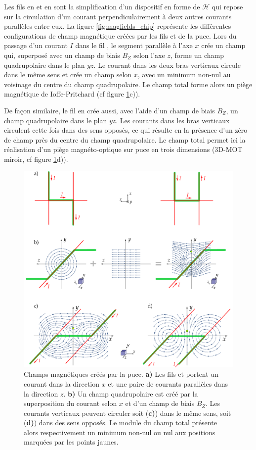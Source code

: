 Les fils en  et en  sont la simplification d'un dispositif en forme de $\mathcal{H}$ qui repose sur la circulation d'un courant perpendiculairement à deux autres courants parallèles entre eux.
La figure \eqref{fig:magfields_chip} représente les différentes configurations de champ magnétique créées par les fils  et  de la puce.
Lors du passage d'un courant $I$ dans le fil , le segment parallèle à l'axe $x$ crée un champ qui, superposé avec un champ de biais $B_Z$ selon l'axe $z$, forme un champ quadrupolaire dans le plan $yz$.
Le courant dans les deux bras verticaux circule dans le même sens et crée un champ selon $x$, avec un  minimum non-nul au voisinage du centre du champ quadrupolaire.
Le champ total forme alors un piège magnétique de Ioffe-Pritchard (cf figure \ref{fig:magfields_chip}c)).

De façon similaire, le fil en  crée aussi, avec l'aide d'un champ de biais $B_Z$, un champ quadrupolaire dans le plan $yz$.
Les courants dans les bras verticaux circulent cette fois dans des sens opposés, ce qui résulte en la présence d'un zéro de champ près du centre du champ quadrupolaire.
Le champ total permet ici la réalisation d'un piège magnéto-optique sur puce en trois dimensions (\og 3D-MOT miroir\fg{}, cf figure \ref{fig:magfields_chip}d)).

\begin{figure}[]
\centering
\includegraphics[width=\linewidth]{figures/setup/coldatoms/magfields_chip}
\caption[Champs magnétiques créés par la puce]{
Champs magnétiques créés par la puce.
\textbf{a)} Les fils  et  portent un courant dans la direction $x$ et une paire de courants parallèles dans la direction $z$.
\textbf{b)} Un champ quadrupolaire est créé par la superposition du courant selon $x$ et d'un champ de biais $B_Z$.
Les courants verticaux peuvent circuler soit (\textbf{c)}) dans le même sens,  soit (\textbf{d)}) dans des sens opposés.
Le module du champ total présente alors respectivement un minimum non-nul ou nul aux positions marquées par les points jaunes.
}
\label{fig:magfields_chip}
\end{figure}

